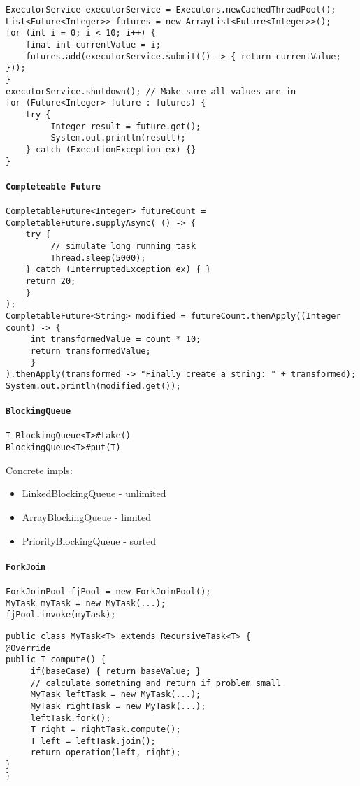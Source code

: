 \begin{verbatim}
ExecutorService executorService = Executors.newCachedThreadPool(); 
List<Future<Integer>> futures = new ArrayList<Future<Integer>>(); 
for (int i = 0; i < 10; i++) {
    final int currentValue = i;
    futures.add(executorService.submit(() -> { return currentValue; }));
}
executorService.shutdown(); // Make sure all values are in
for (Future<Integer> future : futures) { 
    try {
         Integer result = future.get();
         System.out.println(result);
    } catch (ExecutionException ex) {}
} 
\end{verbatim}

\paragraph{\texttt{Completeable Future}}
\begin{verbatim}
CompletableFuture<Integer> futureCount = CompletableFuture.supplyAsync( () -> {
    try {
         // simulate long running task 
         Thread.sleep(5000);
    } catch (InterruptedException ex) { }
    return 20; 
    }
);
CompletableFuture<String> modified = futureCount.thenApply((Integer count) -> {
     int transformedValue = count * 10;
     return transformedValue; 
     }
).thenApply(transformed -> "Finally create a string: " + transformed);
System.out.println(modified.get());
\end{verbatim}


\paragraph{\texttt{BlockingQueue}}
\begin{verbatim}
T BlockingQueue<T>#take()
BlockingQueue<T>#put(T)
\end{verbatim}
Concrete impls:
\begin{itemize}
	\item LinkedBlockingQueue - unlimited
	\item ArrayBlockingQueue - limited
	\item PriorityBlockingQueue - sorted
\end{itemize}

\paragraph{\texttt{ForkJoin}}
\begin{verbatim}
ForkJoinPool fjPool = new ForkJoinPool();
MyTask myTask = new MyTask(...);
fjPool.invoke(myTask);
\end{verbatim}
\begin{verbatim}
public class MyTask<T> extends RecursiveTask<T> {
@Override
public T compute() {
     if(baseCase) { return baseValue; }
     // calculate something and return if problem small
     MyTask leftTask = new MyTask(...); 
     MyTask rightTask = new MyTask(...);
     leftTask.fork();
     T right = rightTask.compute();
     T left = leftTask.join();
     return operation(left, right);
}
}
\end{verbatim}
